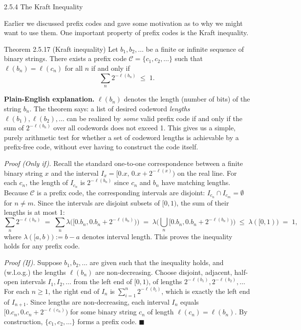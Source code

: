 \documentclass[aspectratio=169,10pt]{beamer}
\begin{document}
\begin{frame}[allowframebreaks]{2.5.4 The Kraft Inequality}

Earlier we discussed prefix codes and gave some motivation as to why we
might want to use them. One important property of prefix codes is the Kraft
inequality.

\begin{block}{Theorem 2.5.17 (Kraft inequality)}
Let $b_1, b_2, \ldots$ be a finite or infinite sequence of binary strings.
There exists a prefix code $\mathcal{C} = \{c_1, c_2, \ldots\}$ such that
$\ell(b_n) = \ell(c_n)$ for all $n$ if and only if
\[
  \sum_n 2^{-\ell(b_n)} \;\leq\; 1.
\]
\end{block}

\textbf{Plain-English explanation.} $\ell(b_n)$ denotes the length (number
of bits) of the string $b_n$. The theorem says: a list of desired codeword
\emph{lengths} $\ell(b_1), \ell(b_2), \ldots$ can be realized by \emph{some}
valid prefix code if and only if the sum of $2^{-\ell(b_n)}$ over all
codewords does not exceed 1. This gives us a simple, purely arithmetic test
for whether a set of codeword lengths is achievable by a prefix-free code,
without ever having to construct the code itself.

\framebreak

\textit{Proof (Only if).} Recall the standard one-to-one correspondence
between a finite binary string $x$ and the interval $I_x = [0.x,\, 0.x +
2^{-\ell(x)})$ on the real line. For each $c_n$, the length of $I_{c_n}$ is
$2^{-\ell(b_n)}$ since $c_n$ and $b_n$ have matching lengths. Because
$\mathcal{C}$ is a prefix code, the corresponding intervals are disjoint:
$I_{c_n} \cap I_{c_m} = \emptyset$ for $n \ne m$. Since the intervals are
disjoint subsets of $[0,1)$, the sum of their lengths is at most 1:
\[
  \sum_n 2^{-\ell(b_n)} \;=\; \sum_n \lambda\big([0.b_n, 0.b_n+2^{-\ell(b_n)})\big) \;=\; \lambda\Big(\bigcup_n [0.b_n, 0.b_n + 2^{-\ell(b_n)})\Big) \;\leq\; \lambda([0,1)) \;=\; 1,
\]
where $\lambda([a,b)) := b-a$ denotes interval length. This proves the
inequality holds for any prefix code.

\textit{Proof (If).} Suppose $b_1, b_2, \ldots$ are given such that the
inequality holds, and (w.l.o.g.) the lengths $\ell(b_n)$ are non-decreasing.
Choose disjoint, adjacent, half-open intervals $I_1, I_2, \ldots$ from the
left end of $[0,1)$, of lengths $2^{-\ell(b_1)}, 2^{-\ell(b_2)}, \ldots$ For
each $n\geq 1$, the right end of $I_n$ is $\sum_{i=1}^n 2^{-\ell(b_i)}$,
which is exactly the left end of $I_{n+1}$. Since lengths are
non-decreasing, each interval $I_n$ equals $[0.c_n, 0.c_n + 2^{-\ell(c_n)})$
for some binary string $c_n$ of length $\ell(c_n) = \ell(b_n)$. By
construction, $\{c_1, c_2, \ldots\}$ forms a prefix code. $\blacksquare$


\end{frame}
\end{document}
